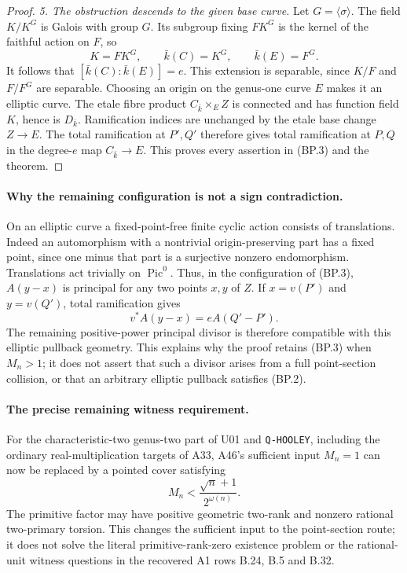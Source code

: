 \begin{proof}
\emph{5. The obstruction descends to the given base curve.}
Let $G=\langle\sigma\rangle$.
The field $K/K^G$ is Galois with group $G$. Its subgroup fixing
$FK^G$ is the kernel of the faithful action on $F$, so
\[
             K=FK^G,\qquad \bar k(C)=K^G,
                 \qquad \bar k(E)=F^G.
 \tag{BP.13}
\]
It follows that $[\bar k(C):\bar k(E)]=e$. This extension is
separable, since $K/F$ and $F/F^G$ are separable. Choosing an
origin on the genus-one curve $E$ makes it an elliptic curve.
The etale fibre product $C_{\bar k}\times_E Z$ is connected
and has function field $K$, hence is $D_{\bar k}$.
Ramification indices are unchanged by the etale base change
$Z\to E$. The total ramification at $P',Q'$ therefore gives
total ramification at $P,Q$ in the degree-$e$ map $C_{\bar k}\to E$.
This proves every assertion in (BP.3) and the theorem.
\end{proof}

\paragraph{Why the remaining configuration is not a sign contradiction.}
On an elliptic curve a fixed-point-free finite cyclic action
consists of translations. Indeed an automorphism with a nontrivial
origin-preserving part has a fixed point, since one minus that
part is a surjective nonzero endomorphism. Translations act
trivially on $\operatorname{Pic}^0$. Thus, in the configuration
of (BP.3), $A(y-x)$ is principal for any two points $x,y$ of
$Z$. If $x=v(P')$ and $y=v(Q')$, total ramification gives
\[
                   v^*A(y-x)=eA(Q'-P').
 \tag{BP.14}
\]
The remaining positive-power principal divisor is therefore
compatible with this elliptic pullback geometry. This explains
why the proof retains (BP.3) when $M_n>1$; it does not assert
that such a divisor arises from a full point-section collision,
or that an arbitrary elliptic pullback satisfies (BP.2).

\paragraph{The precise remaining witness requirement.}
For the characteristic-two genus-two part of U01 and
\texttt{Q-HOOLEY}, including the ordinary real-multiplication
targets of A33, A46's sufficient input $M_n=1$ can now be
replaced by a pointed cover satisfying
\[
                 M_n<\frac{\sqrt n+1}{2^{\omega(n)}}.
 \tag{BP.15}
\]
The primitive factor may have positive geometric two-rank and
nonzero rational two-primary torsion. This changes the sufficient
input to the point-section route; it does not solve the literal
primitive-rank-zero existence problem or the rational-unit
witness questions in the recovered A1 rows B.24, B.5 and B.32.

